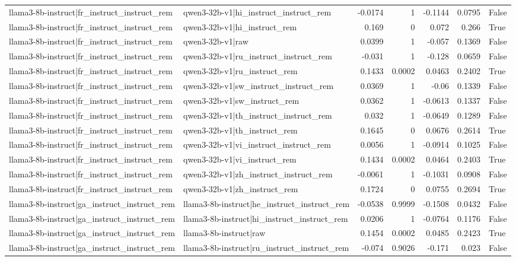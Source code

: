 \begin{table}
\begin{tabular}{l l r r r r l}
llama3-8b-instruct|fr_instruct_instruct_rem & qwen3-32b-v1|hi_instruct_instruct_rem & -0.0174 & 1 & -0.1144 & 0.0795 & False \\
llama3-8b-instruct|fr_instruct_instruct_rem & qwen3-32b-v1|hi_instruct_rem & 0.169 & 0 & 0.072 & 0.266 & True \\
llama3-8b-instruct|fr_instruct_instruct_rem & qwen3-32b-v1|raw & 0.0399 & 1 & -0.057 & 0.1369 & False \\
llama3-8b-instruct|fr_instruct_instruct_rem & qwen3-32b-v1|ru_instruct_instruct_rem & -0.031 & 1 & -0.128 & 0.0659 & False \\
llama3-8b-instruct|fr_instruct_instruct_rem & qwen3-32b-v1|ru_instruct_rem & 0.1433 & 0.0002 & 0.0463 & 0.2402 & True \\
llama3-8b-instruct|fr_instruct_instruct_rem & qwen3-32b-v1|sw_instruct_instruct_rem & 0.0369 & 1 & -0.06 & 0.1339 & False \\
llama3-8b-instruct|fr_instruct_instruct_rem & qwen3-32b-v1|sw_instruct_rem & 0.0362 & 1 & -0.0613 & 0.1337 & False \\
llama3-8b-instruct|fr_instruct_instruct_rem & qwen3-32b-v1|th_instruct_instruct_rem & 0.032 & 1 & -0.0649 & 0.1289 & False \\
llama3-8b-instruct|fr_instruct_instruct_rem & qwen3-32b-v1|th_instruct_rem & 0.1645 & 0 & 0.0676 & 0.2614 & True \\
llama3-8b-instruct|fr_instruct_instruct_rem & qwen3-32b-v1|vi_instruct_instruct_rem & 0.0056 & 1 & -0.0914 & 0.1025 & False \\
llama3-8b-instruct|fr_instruct_instruct_rem & qwen3-32b-v1|vi_instruct_rem & 0.1434 & 0.0002 & 0.0464 & 0.2403 & True \\
llama3-8b-instruct|fr_instruct_instruct_rem & qwen3-32b-v1|zh_instruct_instruct_rem & -0.0061 & 1 & -0.1031 & 0.0908 & False \\
llama3-8b-instruct|fr_instruct_instruct_rem & qwen3-32b-v1|zh_instruct_rem & 0.1724 & 0 & 0.0755 & 0.2694 & True \\
llama3-8b-instruct|ga_instruct_instruct_rem & llama3-8b-instruct|he_instruct_instruct_rem & -0.0538 & 0.9999 & -0.1508 & 0.0432 & False \\
llama3-8b-instruct|ga_instruct_instruct_rem & llama3-8b-instruct|hi_instruct_instruct_rem & 0.0206 & 1 & -0.0764 & 0.1176 & False \\
llama3-8b-instruct|ga_instruct_instruct_rem & llama3-8b-instruct|raw & 0.1454 & 0.0002 & 0.0485 & 0.2423 & True \\
llama3-8b-instruct|ga_instruct_instruct_rem & llama3-8b-instruct|ru_instruct_instruct_rem & -0.074 & 0.9026 & -0.171 & 0.023 & False \\

\end{tabular}
\end{table}
